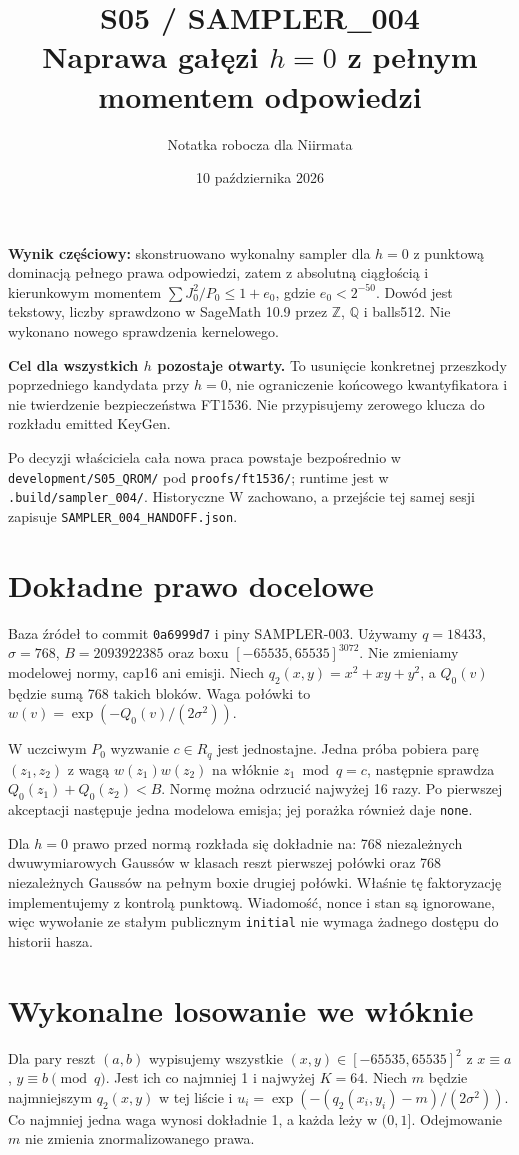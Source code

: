 \documentclass[11pt,a4paper]{article}
\title{S05 / SAMPLER\_004\\\large Naprawa gałęzi $h=0$ z pełnym momentem odpowiedzi}
\author{Notatka robocza dla Niirmata}
\date{10 października 2026}
\newcommand{\code}[1]{\nolinkurl{#1}}
\begin{document}
\maketitle

\textbf{Wynik częściowy:} skonstruowano wykonalny sampler dla $h=0$
z punktową dominacją pełnego prawa odpowiedzi, zatem z absolutną ciągłością
i kierunkowym momentem $\sum J_0^2/P_0\le1+e_0$, gdzie $e_0<2^{-50}$.
Dowód jest tekstowy, liczby sprawdzono w SageMath 10.9 przez $\mathbb Z$,
$\mathbb Q$ i balls512. Nie wykonano nowego sprawdzenia kernelowego.

\textbf{Cel dla wszystkich $h$ pozostaje otwarty.} To usunięcie konkretnej
przeszkody poprzedniego kandydata przy $h=0$, nie ograniczenie końcowego
kwantyfikatora i nie twierdzenie bezpieczeństwa FT1536.
Nie przypisujemy zerowego klucza do rozkładu emitted KeyGen.

Po decyzji właściciela cała nowa praca powstaje bezpośrednio w
\code{development/S05_QROM/} pod \code{proofs/ft1536/}; runtime jest w
\code{.build/sampler_004/}. Historyczne W zachowano, a przejście tej samej
sesji zapisuje \code{SAMPLER_004_HANDOFF.json}.

\section{Dokładne prawo docelowe}
Baza źródeł to commit \code{0a6999d7} i piny SAMPLER-003.
Używamy $q=18433$, $\sigma=768$, $B=2093922385$ oraz boxu
$[-65535,65535]^{3072}$. Nie zmieniamy modelowej normy, cap16 ani emisji.
Niech $q_2(x,y)=x^2+xy+y^2$, a $Q_0(v)$ będzie sumą 768 takich bloków.
Waga połówki to $w(v)=\exp(-Q_0(v)/(2\sigma^2))$.

W uczciwym $P_0$ wyzwanie $c\in R_q$ jest jednostajne. Jedna próba pobiera
parę $(z_1,z_2)$ z wagą $w(z_1)w(z_2)$ na włóknie
$z_1\bmod q=c$, następnie sprawdza $Q_0(z_1)+Q_0(z_2)<B$.
Normę można odrzucić najwyżej 16 razy. Po pierwszej akceptacji następuje
jedna modelowa emisja; jej porażka również daje \code{none}.

Dla $h=0$ prawo przed normą rozkłada się dokładnie na:
768 niezależnych dwuwymiarowych Gaussów w klasach reszt pierwszej połówki
oraz 768 niezależnych Gaussów na pełnym boxie drugiej połówki.
Właśnie tę faktoryzację implementujemy z kontrolą punktową.
Wiadomość, nonce i stan są ignorowane, więc wywołanie ze stałym
publicznym \code{initial} nie wymaga żadnego dostępu do historii hasza.

\section{Wykonalne losowanie we włóknie}
Dla pary reszt $(a,b)$ wypisujemy wszystkie
$(x,y)\in[-65535,65535]^2$ z $x\equiv a$, $y\equiv b\pmod q$.
Jest ich co najmniej 1 i najwyżej $K=64$.
Niech $m$ będzie najmniejszym $q_2(x,y)$ w tej liście i
$u_i=\exp(-(q_2(x_i,y_i)-m)/(2\sigma^2))$.
Co najmniej jedna waga wynosi dokładnie 1, a każda leży w $(0,1]$.
Odejmowanie $m$ nie zmienia znormalizowanego prawa.
\end{document}
